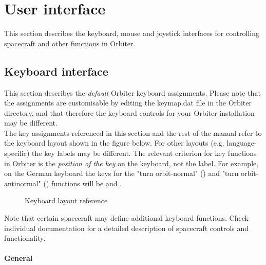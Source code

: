 \documentclass[Orbiter User Manual.tex]{subfiles}
\begin{document}
\section{User interface}
This section describes the keyboard, mouse and joystick interfaces for controlling spacecraft and other functions in Orbiter.


\subsection{Keyboard interface}
This section describes the \textit{default} Orbiter keyboard assignments. Please note that the assignments are customisable by editing the keymap.dat file in the Orbiter directory, and that therefore the keyboard controls for your Orbiter installation may be different.\\
The key assignments referenced in this section and the rest of the manual refer to the keyboard layout shown in the figure below. For other layouts (e.g. language-specific) the key labels may be different. The relevant criterion for key functions in Orbiter is the \textit{position of the key} on the keyboard, not the label. For example, on the German keyboard the keys for the "turn orbit-normal" (\keystroke{;}) and "turn orbit-antinormal" () functions will be  and .

\begin{figure}[H]
	\centering
	\caption{Keyboard layout reference}
\end{figure}

\noindent
Note that certain spacecraft may define additional keyboard functions. Check individual documentation for a detailed description of spacecraft controls and functionality.\\
\\
\textbf{General}
\end{document}
